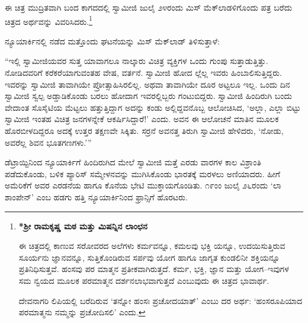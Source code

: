 ಈ ಚಿತ್ರ ಮುದ್ರಿತವಾಗಿ ಬಂದ ಕಾಗದದಲ್ಲಿ ಸ್ವಾಮೀಜಿ ಜುಲೈ ೨೪ರಂದು ಮಿಸ್ ಮೆಕ್​ಲಾಡಳಿಗೊಂದು ಪತ್ರ ಬರೆದು ಚಿತ್ರದ ಅರ್ಥವನ್ನು ವಿವರಿಸಿದರು.\footnote{\textbf{*ಶ್ರೀ ರಾಮಕೃಷ್ಣ ಮಠ ಮತ್ತು ಮಿಷನ್ನಿನ ಲಾಂಛನ}

ಈ ಚಿತ್ರದಲ್ಲಿ ಕಾಣುವ ಸರೋವರದ ಅಲೆಗಳು ಕರ್ಮವನ್ನೂ, ಕಮಲವು ಭಕ್ತಿ ಯನ್ನೂ, ಉದಯಿಸುತ್ತಿರುವ ಸೂರ್ಯನು ಜ್ಞಾನವನ್ನೂ, ಸುತ್ತಿಕೊಂಡಿರುವ ಸರ್ಪವು ಯೋಗ ಹಾಗೂ ಜಾಗೃತ ಕುಂಡಲಿನೀ ಶಕ್ತಿಯನ್ನೂ ಪ್ರತಿನಿಧಿಸುತ್ತವೆ. ಹಂಸವು ಪರ ಮಾತ್ಮನ ಪ್ರತೀಕವಾಗಿರುತ್ತದೆ. ಕರ್ಮ, ಭಕ್ತಿ, ಜ್ಞಾನ ಮತ್ತು ಯೋಗ–ಇವುಗಳ ಸಮ ನ್ವಯದ ಮೂಲಕ ಪರಮಾತ್ಮನ ದರ್ಶನಲಾಭವಾಗುತ್ತದೆ ಎಂಬುವುದು ಈ ಚಿತ್ರದ ಭಾವಾರ್ಥ.

ದೇವನಾಗರಿ ಲಿಪಿಯಲ್ಲಿ ಬರೆದಿರುವ ‘ತನ್ನೋ ಹಂಸಃ ಪ್ರಚೋದಯಾತ್​’ ಎಂಬು ದರ ಅರ್ಥ: ‘ಹಂಸರೂಪಿಯಾದ ಪರಮಾತ್ಮನು ನಮ್ಮನ್ನು ಪ್ರಚೋದಿಸಲಿ’ ಎಂದು.}

ನ್ಯೂಯಾರ್ಕಿನಲ್ಲಿ ನಡೆದ ಮತ್ತೊಂದು ಘಟನೆಯನ್ನು ಮಿಸ್ ಮೆಕ್​ಲಾಡ್ ತಿಳಿಸುತ್ತಾಳೆ:

“ಇಲ್ಲಿ ಸ್ವಾಮೀಜಿಯವರ ಸುತ್ತ ಯಾವಾಗಲೂ ನಾಲ್ಕಾರು ವಿಚಿತ್ರ ವ್ಯಕ್ತಿಗಳ ಒಂದು ಗುಂಪು ಸುತ್ತಾಡುತ್ತಿತ್ತು. ನೋಡಿದವರಿಗೆ ಕರೆಕರೆಯಾಗುವಂತಹ ವೇಷ, ವರ್ತನೆ. ಸ್ವಾಮೀಜಿ ಹೋದ ಲ್ಲೆಲ್ಲ ಇವರು ಹಿಂಬಾಲಿಸುತ್ತಿದ್ದರು. ಇವರನ್ನು ಸ್ವಾಮೀಜಿ ತಾವಾಗಿಯೇ ಪ್ರೋತ್ಸಾಹಿಸಿರಲಿಲ್ಲ. ಅಥವಾ ತಾವಾಗಿಯೇ ದೂರ ಅಟ್ಟಲೂ ಇಲ್ಲ. ಒಂದು ದಿನ ಸ್ವಾಮೀಜಿ ಸ್ವಲ್ಪ ಅಡ್ಡಾಡಿಕೊಂಡು ಬರಲು ಹೋದಾಗ ಇವರಲ್ಲಿಬ್ಬರು ಗಂಟುಬಿದ್ದರು. ಸ್ವಾಮೀಜಿ ಹಿಂದಿರುಗಿ ಬಂದು ವೇದಾಂತ ಸೊಸೈಟಿಯ ಮೆಟ್ಟಲು ಹತ್ತುತ್ತಿದ್ದಾಗ ಅದನ್ನು ಕಂಡು ಅಲ್ಲಿದ್ದವನೊಬ್ಬ ಆಲೋಚಿಸಿದ, ‘ಅಲ್ಲಾ, ಎಲ್ಲಾ ಬಿಟ್ಟು ಸ್ವಾಮೀಜಿ ಇಂತಹ ವಿಚಿತ್ರ ಜನಗಳನ್ನೇಕೆ ಆಕರ್ಷಿಸಿದ್ದಾರೆ!’ ಎಂದು. ಅವನ ಈ ಆಲೋಚನೆ ಮಾತಿನ ಮೂಲಕ ಹೊರಬೀಳದಿದ್ದರೂ ಅದಕ್ಕೆ ಉತ್ತರ ತಕ್ಷಣವೇ ಸಿಕ್ಕಿತು. ಸರ್ರನೆ ಅವನತ್ತ ತಿರುಗಿ ಸ್ವಾಮೀಜಿ ಹೇಳಿದರು, ‘ನೋಡು, ಅವರೆಲ್ಲ ಶಿವನ ಭೂತಗಣಗಳು.’”

ಡೆಟ್ರಾಯ್ಟಿನಿಂದ ನ್ಯೂಯಾರ್ಕಿಗೆ ಹಿಂದಿರುಗಿದ ಮೇಲೆ ಸ್ವಾಮೀಜಿ ಮತ್ತೆ ಎರಡು ವಾರಗಳ ಕಾಲ ವಿಶ್ರಾಂತಿ ಪಡೆದುಕೊಂಡು, ಬಳಿಕ ಪ್ಯಾರಿಸ್ ಸಮ್ಮೇಳನವನ್ನು ಮುಗಿಸಿಕೊಂಡು ಭಾರತಕ್ಕೆ ಮರಳಲು ಅಣಿಯಾದರು. ಹೀಗೆ ಅಮೆರಿಕೆಗೆ ಅವರ ಎರಡನೆಯ ಹಾಗೂ ಕೊನೆಯ ಭೇಟಿ ಮುಕ್ತಾಯಗೊಂಡಿತು. ೧೯ಂಂ ಜುಲೈ ೨೬ರಂದು ‘ಲಾ ಶಾಂಪೇನ್​’ ಎಂಬ ಹಡಗು ಹತ್ತಿ ನ್ಯೂಯಾರ್ಕಿನಿಂದ ಫ್ರಾನ್ಸಿಗೆ ಹೊರಟರು.

